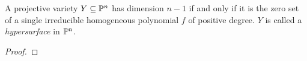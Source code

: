\label{1.2.8}

A projective variety $Y \subseteq \P^n$ has dimension $n - 1$ if and only if it is the zero set of a single irreducible homogeneous polynomial $f$ of positive degree. $Y$ is called a \textit{hypersurface} in $\P^n$.

\begin{proof}
    
\end{proof}